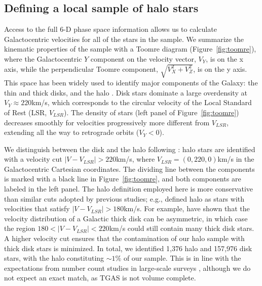 \documentclass[apj, twocolappendix, numberedappendix, appendixfloats]{emulateapj}
\begin{document}
\subsection{Defining a local sample of halo stars}
\label{sec:sample}
Access to the full 6-D phase space information allows us to calculate Galactocentric velocities for all of the stars in the sample.
We summarize the kinematic properties of the sample with a Toomre diagram (Figure~\ref{fig:toomre}), where the Galactocentric $Y$ component on the velocity vector, $V_Y$, is on the x axis, while the perpendicular Toomre component, $\sqrt{V_X^2+V_Z^2}$, is on the y axis. 
This space has been widely used to identify major components of the Galaxy: the thin and thick disks, and the halo \citep[e.g.,][]{venn2004}.
Disk stars dominate a large overdensity at $V_Y\approx220$\;km/s, which corresponds to the circular velocity of the Local Standard of Rest (LSR, $V_{LSR}$).
The density of stars (left panel of Figure~\ref{fig:toomre}) decreases smoothly for velocities progressively more different from $V_{LSR}$, extending all the way to retrograde orbits ($V_Y<0$).

We distinguish between the disk and the halo following \citet{ns2010}: halo stars are identified with a velocity cut $|V-V_{LSR}|>220$\;km/s, where $V_{LSR} = (0,220,0)$\;km/s in the Galactocentric Cartesian coordinates.
The dividing line between the components is marked with a black line in Figure~\ref{fig:toomre}, and both components are labeled in the left panel.
The halo definition employed here is more conservative than similar cuts adopted by previous studies; e.g., \citet{ns2010} defined halo as stars with velocities that satisfy $|V-V_{LSR}|>180$\;km/s.
For example, \citet{sb2009} have shown that the velocity distribution of a Galactic thick disk can be asymmetric, in which case the region $180<|V-V_{LSR}|<220$\;km/s could still contain many thick disk stars.
A higher velocity cut ensures that the contamination of our halo sample with thick disk stars is minimized.
In total, we identified 1,376 halo and 157,976 disk stars, with the halo constituting $\sim1\%$ of our sample.
This is in line with the expectations from number count studies in large-scale surveys \citep[e.g.,][]{juric2008}, although we do not expect an exact match, as TGAS is not volume complete.
\end{document}
